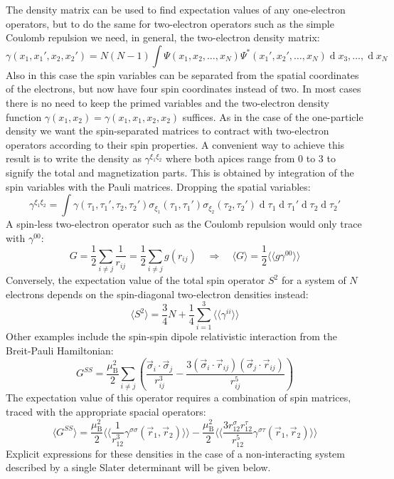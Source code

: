 \documentclass[12pt]{article}
\newcommand{\dd}{\operatorname{d}}
\newcommand{\ev}[1]{\langle #1 \rangle}
\newcommand{\evv}[1]{\langle\langle #1 \rangle\rangle}
\begin{document}
The density matrix can be used to find expectation values of any one-electron operators, but to do the same for two-electron operators such as the simple Coulomb repulsion we need, in general, the two-electron density matrix:
\begin{equation}
 \gamma(x_1,x_1',x_2,x_2') = N(N-1)\int\Psi(x_1,x_2,\dots,x_N)\Psi^*(x_1',x_2',\dots,x_N)\dd x_3,\dots,\dd x_N
\end{equation}
Also in this case the spin variables can be separated from the spatial coordinates of the electrons, but now have four spin coordinates instead of two.
In most cases there is no need to keep the primed variables and the two-electron density function $\gamma(x_1,x_2)=\gamma(x_1,x_1,x_2,x_2)$ suffices.
As in the case of the one-particle density we want the spin-separated matrices to contract with two-electron operators according to their spin properties.
A convenient way to achieve this result is to write the density as $\gamma^{\xi_1\xi_2}$ where both apices range from 0 to 3 to signify the total and magnetization parts.
This is obtained by integration of the spin variables with the Pauli matrices. Dropping the spatial variables:
\begin{equation}
\label{eq:gamma12}
 \gamma^{\xi_1\xi_2} = \int \gamma(\tau_1,\tau_1',\tau_2,\tau_2')\sigma_{\xi_1}(\tau_1,\tau_1')\sigma_{\xi_2}(\tau_2,\tau_2')\dd\tau_1\dd\tau_1'\dd\tau_2\dd\tau_2'
\end{equation}
A spin-less two-electron operator such as the Coulomb repulsion would only trace with $\gamma^{00}$:
\begin{equation}
 G = \frac{1}{2}\sum_{i\ne j}\frac{1}{r_{ij}} = \frac{1}{2}\sum_{i\ne j}g(r_{ij}) \quad\Longrightarrow\quad \ev{G} = \frac{1}{2}\evv{g\gamma^{00}}
\end{equation}
Conversely, the expectation value of the total spin operator $S^2$ for a system of $N$ electrons depends on the spin-diagonal two-electron densities instead:
\begin{equation}
\label{eq:S2}
 \ev{S^2} = \frac{3}{4}N + \frac{1}{4}\sum_{i=1}^3 \evv{\gamma^{ii}}
\end{equation}
Other examples include the spin-spin dipole relativistic interaction from the Breit-Pauli Hamiltonian:\cite{Dyall07_book327}
\begin{equation}
 G^{SS} = \frac{\mu_\mathrm{B}^2}{2} \sum_{i\ne j} \left(
  \frac{\vec{\sigma}_i\cdot\vec{\sigma}_j}{r_{ij}^3} -
  \frac{3(\vec{\sigma}_i\cdot\vec{r}_{ij})(\vec{\sigma}_j\cdot\vec{r}_{ij})}{r_{ij}^5} \right)
\end{equation}
The expectation value of this operator requires a combination of spin matrices, traced with the appropriate spacial operators:
\begin{equation}
 \ev{G^{SS}} = \frac{\mu_\mathrm{B}^2}{2}\evv{\frac{1}{r_{12}^3}\gamma^{\sigma\sigma}(\vec{r}_1,\vec{r}_2)} - 
               \frac{\mu_\mathrm{B}^2}{2}\evv{\frac{3r^\sigma_{12}r^\tau_{12}}{r_{12}^5}\gamma^{\sigma\tau}(\vec{r}_1,\vec{r}_2)} 
\end{equation}
Explicit expressions for these densities in the case of a non-interacting system described by a single Slater determinant will be given below.
\end{document}

